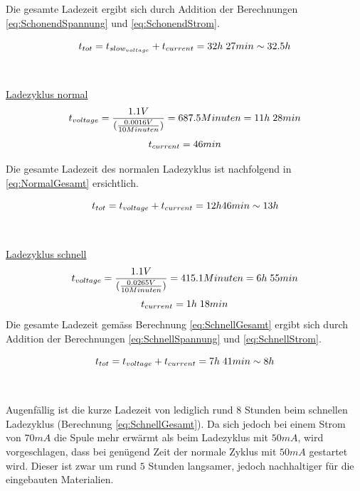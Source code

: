 Die gesamte Ladezeit ergibt sich durch Addition der Berechnungen \ref{eq:SchonendSpannung} und \ref{eq:SchonendStrom}.

\begin{equation}
\centering
t_{tot}=t_{slow_{voltage}}+t_{current}=32h\thickspace 27min \sim 32.5h
\label{eq:SchonendGesamt}
\end{equation}
\\
\\


\underline{Ladezyklus normal}
\begin{equation}
\centering
t_{voltage}=\frac{1.1 V}{(\frac{0.0016 V}{10 Minuten})}=687.5 Minuten= 11h\thickspace 28min
\label{eq:NormalSpannung}
\end{equation}
\begin{equation}
\centering
t_{current}= 46min
\label{eq:NormalStrom}
\end{equation}

Die gesamte Ladezeit des normalen Ladezyklus ist nachfolgend in \ref{eq:NormalGesamt} ersichtlich.

\begin{equation}
\centering
t_{tot}=t_{voltage}+t_{current}=12h\space 46min \sim 13h
\label{eq:NormalGesamt}
\end{equation}
\\
\\


\underline{Ladezyklus schnell}
\begin{equation}
\centering
t_{voltage}=\frac{1.1 V}{(\frac{0.0265 V}{10 Minuten})}=415.1 Minuten= 6h\thickspace 55min
\label{eq:SchnellSpannung}
\end{equation}
\begin{equation}
\centering
t_{current}= 1h\thickspace 18min
\label{eq:SchnellStrom}
\end{equation}
Die gesamte Ladezeit gemäss Berechnung \ref{eq:SchnellGesamt} ergibt sich durch Addition der Berechnungen \ref{eq:SchnellSpannung} und \ref{eq:SchnellStrom}.

\begin{equation}
\centering
t_{tot}=t_{voltage}+t_{current}=7h\thickspace 41min \sim 8h
\label{eq:SchnellGesamt}
\end{equation}
\\
\\
 
Augenfällig ist die kurze Ladezeit von lediglich rund $8$ Stunden beim schnellen Ladezyklus (Berechnung \ref{eq:SchnellGesamt}). Da sich jedoch bei einem Strom von $70mA$ die Spule mehr erwärmt als beim Ladezyklus mit $50mA$, wird vorgeschlagen, dass bei genügend Zeit der normale Zyklus mit $50mA$ gestartet wird. Dieser ist zwar um rund $5$ Stunden langsamer, jedoch nachhaltiger für die eingebauten Materialien.


